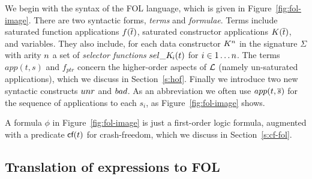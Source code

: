 We begin with the syntax of the FOL language, which is given in
Figure~\ref{fig:fol-image}. There are two syntactic forms,
\emph{terms} and \emph{formulae}. Terms include saturated function applications
$f(\overline{t})$, saturated constructor applications $K(\overline{t})$, and variables. They
also include, for each data constructor $K^n$ in the signature
$\Sigma$ with arity $n$ a set of {\em selector functions}
$\mathop{sel\_K\!_{i}}(t)$ for $i \in 1 \ldots n$.  The terms $app(t,s)$ and
$f_{ptr}$ concern the higher-order aspects of $\cal L$
(namely un-saturated applications), which we
discuss in Section~\ref{s:hof}.  Finally we introduce two new
syntactic constructs $\mathop{unr}$ and $\mathop{bad}$. As an abbreviation we often use
$app(t,\overline{s})$ for the sequence of applications to each $s_i$, as
Figure~\ref{fig:fol-image} shows.

A formula $\phi$ in Figure~\ref{fig:fol-image} is just a first-order logic
formula, augmented with a predicate $\textsf{cf}(t)$ for crash-freedom, which
we discuss in Section~\ref{s:cf-fol}.

\subsection{Translation of expressions to FOL}

